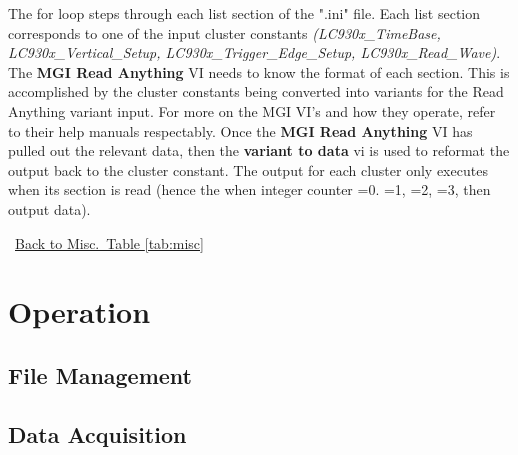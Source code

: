\documentclass[11pt,a4paper,oldfontcommands]{memoir}
\begin{document}
The for loop steps through each list section of the ".ini" file. Each list section corresponds to one of the input cluster constants \textit{(LC930x\_TimeBase, LC930x\_Vertical\_Setup, LC930x\_Trigger\_Edge\_Setup, LC930x\_Read\_Wave)}. The \textbf{MGI Read Anything} VI needs to know the format of each section. This is accomplished by the cluster constants being converted into variants for the Read Anything variant input.  For more on the MGI VI's and how they operate, refer to their help manuals respectably. Once the \textbf{MGI Read Anything} VI has pulled out the relevant data, then the \textbf{variant to data} vi is used to reformat the output back to the cluster constant. The output for each cluster only executes when its section is read (hence the when integer counter =0. =1, =2, =3, then output data).

\noindent\hrulefill\, \hyperref[tab:misc]{Back to Misc.\ Table \ref{tab:misc}}

\chapter{Operation}

\section{File Management}

\section{Data Acquisition}




\end{document}

